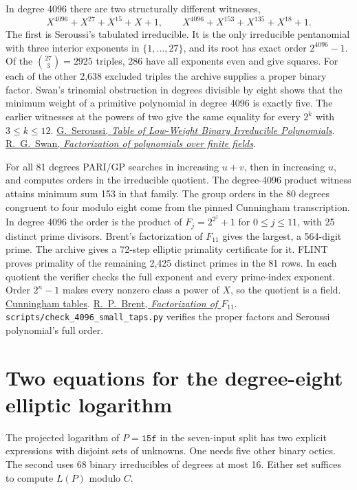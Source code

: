\documentclass[11pt]{article}
\begin{document}
In degree 4096 there are two structurally different witnesses,
\[
 X^{4096}+X^{27}+X^{15}+X+1,\qquad
 X^{4096}+X^{153}+X^{135}+X^{18}+1.
\]
The first is Seroussi's tabulated irreducible. It is the only
irreducible pentanomial with three interior exponents in
\(\{1,\ldots,27\}\), and its root has exact order \(2^{4096}-1\).
Of the \(\binom{27}{3}=2925\) triples, 286 have all exponents even
and give squares. For each of the other 2,638 excluded triples the
archive supplies a proper binary factor. Swan's trinomial
obstruction in degrees divisible by eight shows that the minimum
weight of a primitive polynomial in degree 4096 is exactly five.
The earlier witnesses at the powers of two give the same equality
for every \(2^k\) with \(3\le k\le12\).
\href{https://shiftleft.com/mirrors/www.hpl.hp.com/techreports/98/HPL-98-135.pdf}
{G.~Seroussi, \emph{Table of Low-Weight Binary Irreducible Polynomials}}.
\href{https://doi.org/10.2140/pjm.1962.12.1099}{R.~G.~Swan, \emph{Factorization of polynomials over finite fields}}.

For all 81 degrees PARI/GP searches in increasing \(u+v\), then
in increasing \(u\), and computes orders in the irreducible quotient.
The degree-4096 product witness attains minimum sum 153 in that
family. The group orders in the 80 degrees congruent to four modulo
eight come from the pinned Cunningham transcription. In degree
4096 the order is the product of \(F_j=2^{2^j}+1\) for
\(0\le j\le11\), with 25 distinct prime divisors. Brent's
factorization of \(F_{11}\) gives the largest, a 564-digit prime.
The archive gives a 72-step elliptic primality certificate for it.
FLINT proves primality of the remaining 2,425 distinct primes in the
81 rows. In each quotient the verifier checks the full exponent and
every prime-index exponent. Order \(2^n-1\) makes every nonzero
class a power of \(X\), so the quotient is a field.
\href{https://github.com/postvakje/Reformatted-Cunningham-Project-tables/tree/dff2e282ff15399b16b4fb840a410aa2a37076b7}
{Cunningham tables}.
\href{https://maths-people.anu.edu.au/brent/F11.html}
{R.~P.~Brent, \emph{Factorization of \(F_{11}\)}}.
\nolinkurl{scripts/check_4096_small_taps.py} verifies the proper
factors and Seroussi polynomial's full order.

\section{Two equations for the degree-eight elliptic logarithm}
\label{sec:elliptic-octic-equations}
The projected logarithm of \(P=\mathtt{15f}\) in the seven-input
split has two explicit expressions with disjoint sets of unknowns.
One needs five other binary octics. The second uses 68 binary
irreducibles of degrees at most 16. Either set suffices to compute
\(L(P)\) modulo \(C\).
\end{document}
